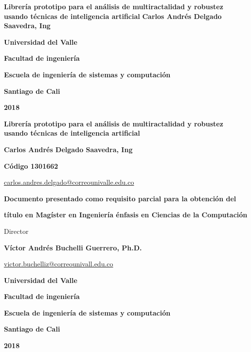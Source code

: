 \begin{titlepage}
		\begin{center}
			{\bf Librería prototipo para el análisis de multiractalidad y robustez usando técnicas de inteligencia artificial}
			\vfill
			{\bf Carlos Andrés Delgado Saavedra, Ing}
			\vfill
			{\bf Universidad del Valle  \par}
			{\bf Facultad de ingeniería \par}
			{\bf Escuela de ingeniería de sistemas y computación \par}
			{\bf Santiago de Cali \par}
			{\bf 2018 \par}
		\end{center}
\end{titlepage}


\begin{titlepage}
	\begin{center}
		{\bf Librería prototipo para el análisis de multiractalidad y robustez usando técnicas de inteligencia artificial}
		\vfill
		{\bf Carlos Andrés Delgado Saavedra, Ing \par}
		{\bf Código 1301662 \par}
		{\url{carlos.andres.delgado@correounivalle.edu.co} \par}
		\vfill
		{\bf Documento presentado como requisito parcial para la obtención del \par}
		{\bf título en Magíster en Ingeniería énfasis en Ciencias de la Computación \par}
		\vfill

		{Director \par}
		{\bf Víctor Andrés Buchelli Guerrero, Ph.D. \par}
		{\url{victor.buchelliz@correounivall.edu.co} \par}
		\vfill
		{\bf Universidad del Valle  \par}
		{\bf Facultad de ingeniería \par}
		{\bf Escuela de ingeniería de sistemas y computación \par}
		{\bf Santiago de Cali \par}
		{\bf 2018 \par}
	\end{center}
\end{titlepage}

